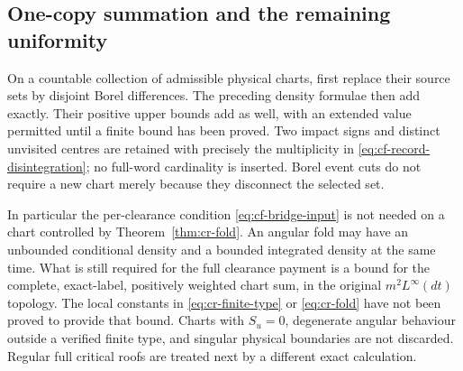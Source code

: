 \subsection{One-copy summation and the remaining uniformity}
On a countable collection of admissible physical charts, first
replace their source sets by disjoint Borel differences. The
preceding density formulae then add exactly. Their positive upper
bounds add as well, with an extended value permitted until a
finite bound has been proved. Two impact signs and distinct
unvisited centres are retained with precisely the multiplicity in
\eqref{eq:cf-record-disintegration}; no full-word cardinality is
inserted. Borel event cuts do not require a new chart merely because
they disconnect the selected set.

In particular the per-clearance condition
\eqref{eq:cf-bridge-input} is not needed on a chart controlled by
Theorem~\ref{thm:cr-fold}. An angular fold may have an unbounded
conditional density and a bounded integrated density at the same
time. What is still required for the full clearance payment is a
bound for the complete, exact-label, positively weighted chart sum,
in the original $m^2 L^\infty(dt)$ topology. The local constants in
\eqref{eq:cr-finite-type} or \eqref{eq:cr-fold} have not been
proved to provide that bound. Charts with $S_u=0$, degenerate
angular behaviour outside a verified finite type, and singular
physical boundaries are not discarded. Regular full critical roofs
are treated next by a different exact calculation.
